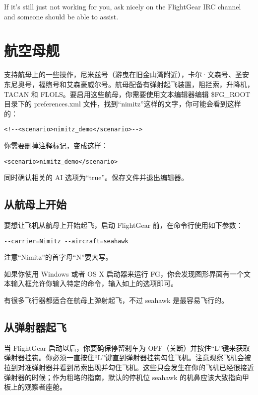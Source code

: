 If it's still just not working for you, ask nicely on the FlightGear IRC channel and someone should be able to assist.
\fi

\ifchinese
\section{航空母舰}\label{carrier}

\FlightGear{} 支持航母上的一些操作，尼米兹号（游曳在旧金山湾附近），卡尔·文森号、圣安东尼奥号，福煦号和艾森豪威尔号。航母配备有弹射起飞装置，阻拦索，升降机，TACAN 和 FLOLS。要启用这些航母，你需要使用文本编辑器编辑 \$FG\_ROOT 目录下的 preferences.xml 文件，找到“nimitz”这样的文字，你可能会看到这样的：

\begin{verbatim}
<!--<scenario>nimitz_demo</scenario>-->
\end{verbatim}

你需要删掉注释标记，变成这样：

\begin{verbatim}
<scenario>nimitz_demo</scenario>
\end{verbatim}

同时确认相关的 AI 选项为“true”。保存文件并退出编辑器。

\subsection{从航母上开始}

要想让飞机从航母上开始起飞，启动 FlightGear 前，在命令行使用如下参数：

\begin{verbatim}
--carrier=Nimitz --aircraft=seahawk
\end{verbatim}

注意“Nimitz”的首字母“N”要大写。

如果你使用 Windows 或者 OS X 启动器来运行 FG，你会发现图形界面有一个文本输入框允许你输入特定的命令，输入如上的选项即可。

有很多飞行器都适合在航母上弹射起飞，不过 seahawk 是最容易飞行的。

\subsection{从弹射器起飞}

当 FlightGear 启动以后，你要确保停留刹车为 OFF（关断）并按住“L”键来获取弹射器挂钩。你必须一直按住“L”键直到弹射器挂钩勾住飞机。注意观察飞机会被拉到对准弹射器并看到吊索出现并勾住飞机。这些只会发生在你的飞机已经很接近弹射器的时候；作为粗略的指南，默认的停机位 seahawk 的机鼻应该大致指向甲板上的观察者座舱。

